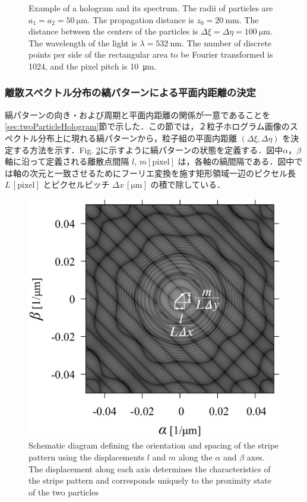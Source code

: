 \begin{figure}[htbp]
    \caption{Example of a hologram and its spectrum. The radii of particles are $a_1 = a_2 = \SI{50}{\um}$. The propagation distance is $z_0 = \SI{20}{\mm}$. The distance between the centers of the particles is $\Delta \xi = \Delta \eta = \SI{100}{\um}$. The wavelength of the light is $\lambda = \SI{532}{\nm}$. The number of discrete points per side of the rectangular area to be Fourier transformed is 1024, and the pixel pitch is \SI{10}{\um}.} 
    \label{fig:2particleSpectrum}
\end{figure}

\subsubsection{離散スペクトル分布の縞パターンによる平面内距離の決定}
縞パターンの向き・および周期と平面内距離の関係が一意であることを\ref{sec:twoParticleHologram}節で示した．この節では，２粒子ホログラム画像のスペクトル分布上に現れる縞パターンから，粒子組の平面内距離 $(\Delta\xi,\Delta\eta)$ を決定する方法を示す．Fig. \ref{fig:stripePatternVector}に示すように縞パターンの状態を定義する．図中$\alpha$，$\beta$軸に沿って定義される離散点間隔 $l,\,m \mathrm{[pixel]}$ は，各軸の縞間隔である．図中では軸の次元と一致させるためにフーリエ変換を施す矩形領域一辺のピクセル長 $L \mathrm{\,[pixel]}$ とピクセルピッチ $\Delta x \mathrm{\,[\si{\um}]}$ の積で除している．
\begin{figure}[H]
    \centering
    \includegraphics[width=0.8\linewidth]{./Figure/2_Theory/stripe_pattern.pdf}
    \caption{Schematic diagram defining the orientation and spacing of the stripe pattern using the displacements $l$ and $m$ along the $\alpha$ and $\beta$ axes. The displacement along each axis determines the characteristics of the stripe pattern and corresponds uniquely to the proximity state of the two particles}
    \label{fig:stripePatternVector}
\end{figure}

